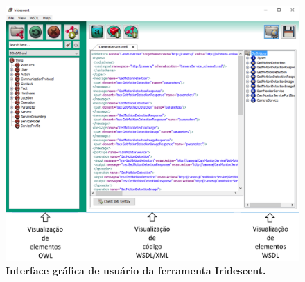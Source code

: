 \begin{figure}[h]
    \includegraphics[scale=0.5]{2-fundamentacao-teorica/imagens/iridescent3.png}
    \centering
    \caption[Interface gráfica de usuário da ferramenta Iridescent.]{\textbf{Interface gráfica de usuário da ferramenta Iridescent.}}
    \label{fig:iridescent}
\end{figure}